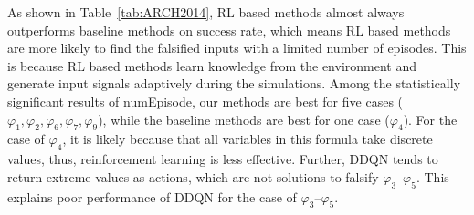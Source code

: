 As shown in Table~\ref{tab:ARCH2014}, RL based methods almost always outperforms baseline methods on success rate, which means RL based methods are more likely to find the falsified inputs with a limited number of episodes.
This is because RL based methods learn knowledge from the environment and generate input signals adaptively during the simulations.
Among the statistically significant results of numEpisode, our methods are best for five cases ($\varphi_1, \varphi_2,\varphi_6,\varphi_7,\varphi_9$), while the baseline methods are best for one case ($\varphi_4$).
For the case of $\varphi_4$, it is likely because that
all variables in this formula take discrete values,
thus, reinforcement learning is less effective.
Further, DDQN tends to return extreme values as actions,
which are not solutions to falsify $\varphi_3$--$\varphi_5$.
This explains poor performance of DDQN for the case of $\varphi_3$--$\varphi_5$.


